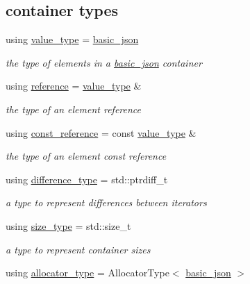 \subsection*{container types}
\begin{DoxyCompactItemize}
\item 
using \hyperlink{classnlohmann_1_1basic__json_ac8d45b57874b4a6e9c07f7d3b5daa1f9}{value\-\_\-type} = \hyperlink{classnlohmann_1_1basic__json}{basic\-\_\-json}
\begin{DoxyCompactList}\small\item\em the type of elements in a \hyperlink{classnlohmann_1_1basic__json}{basic\-\_\-json} container \end{DoxyCompactList}\item 
using \hyperlink{classnlohmann_1_1basic__json_a3ec8e17be8732fe436e9d6733f52b7a3}{reference} = \hyperlink{classnlohmann_1_1basic__json_ac8d45b57874b4a6e9c07f7d3b5daa1f9}{value\-\_\-type} \&
\begin{DoxyCompactList}\small\item\em the type of an element reference \end{DoxyCompactList}\item 
using \hyperlink{classnlohmann_1_1basic__json_af677a29b0e66edc9f66e5167e4667071}{const\-\_\-reference} = const \hyperlink{classnlohmann_1_1basic__json_ac8d45b57874b4a6e9c07f7d3b5daa1f9}{value\-\_\-type} \&
\begin{DoxyCompactList}\small\item\em the type of an element const reference \end{DoxyCompactList}\item 
using \hyperlink{classnlohmann_1_1basic__json_aec316934a555dd1acdd3600e5d4a4cdf}{difference\-\_\-type} = std\-::ptrdiff\-\_\-t
\begin{DoxyCompactList}\small\item\em a type to represent differences between iterators \end{DoxyCompactList}\item 
using \hyperlink{classnlohmann_1_1basic__json_a1579a8f72a230358d6cd1a6e8a62859b}{size\-\_\-type} = std\-::size\-\_\-t
\begin{DoxyCompactList}\small\item\em a type to represent container sizes \end{DoxyCompactList}\item 
using \hyperlink{classnlohmann_1_1basic__json_aa44ce84b9ac506b905b8fb56c9a0989d}{allocator\-\_\-type} = Allocator\-Type$<$ \hyperlink{classnlohmann_1_1basic__json}{basic\-\_\-json} $>$

\end{DoxyCompactItemize}
